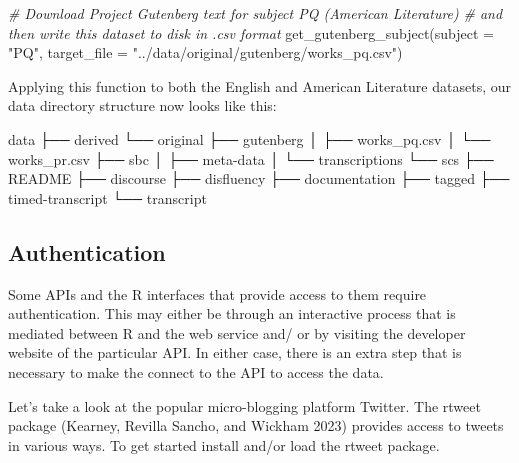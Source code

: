 \documentclass[
  letterpaper,
]{latex/krantz}
\newenvironment{Shaded}{\begin{snugshade}}{\end{snugshade}}
\newcommand{\AttributeTok}[1]{\textcolor[rgb]{0.00,0.00,0.00}{#1}}
\newcommand{\CommentTok}[1]{\textcolor[rgb]{0.00,0.00,0.00}{\textit{#1}}}
\newcommand{\ExtensionTok}[1]{\textcolor[rgb]{0.00,0.00,0.00}{#1}}
\newcommand{\FunctionTok}[1]{\textcolor[rgb]{0.00,0.00,0.00}{#1}}
\newcommand{\NormalTok}[1]{\textcolor[rgb]{0.00,0.00,0.00}{#1}}
\newcommand{\StringTok}[1]{\textcolor[rgb]{0.00,0.00,0.00}{#1}}
\begin{document}
\begin{Shaded}
\begin{Highlighting}[]
\CommentTok{\# Download Project Gutenberg text for subject \textquotesingle{}PQ\textquotesingle{} (American Literature)}
\CommentTok{\# and then write this dataset to disk in .csv format}
\FunctionTok{get\_gutenberg\_subject}\NormalTok{(}\AttributeTok{subject =} \StringTok{"PQ"}\NormalTok{, }\AttributeTok{target\_file =} \StringTok{"../data/original/gutenberg/works\_pq.csv"}\NormalTok{)}
\end{Highlighting}
\end{Shaded}

Applying this function to both the English and American Literature
datasets, our data directory structure now looks like this:

\begin{Shaded}
\begin{Highlighting}[]
\ExtensionTok{data}
\ExtensionTok{├──}\NormalTok{ derived}
\ExtensionTok{└──}\NormalTok{ original}
    \ExtensionTok{├──}\NormalTok{ gutenberg}
    \ExtensionTok{│}\NormalTok{   ├── works\_pq.csv}
    \ExtensionTok{│}\NormalTok{   └── works\_pr.csv}
    \ExtensionTok{├──}\NormalTok{ sbc}
    \ExtensionTok{│}\NormalTok{   ├── meta{-}data}
    \ExtensionTok{│}\NormalTok{   └── transcriptions}
    \ExtensionTok{└──}\NormalTok{ scs}
        \ExtensionTok{├──}\NormalTok{ README}
        \ExtensionTok{├──}\NormalTok{ discourse}
        \ExtensionTok{├──}\NormalTok{ disfluency}
        \ExtensionTok{├──}\NormalTok{ documentation}
        \ExtensionTok{├──}\NormalTok{ tagged}
        \ExtensionTok{├──}\NormalTok{ timed{-}transcript}
        \ExtensionTok{└──}\NormalTok{ transcript}
\end{Highlighting}
\end{Shaded}

\hypertarget{authentication}{%
\subsection{Authentication}\label{authentication}}

Some APIs and the R interfaces that provide access to them require
authentication. This may either be through an interactive process that
is mediated between R and the web service and/ or by visiting the
developer website of the particular API. In either case, there is an
extra step that is necessary to make the connect to the API to access
the data.

Let's take a look at the popular micro-blogging platform Twitter. The
rtweet package (Kearney, Revilla Sancho, and Wickham 2023) provides
access to tweets in various ways. To get started install and/or load the
rtweet package.
\end{document}

